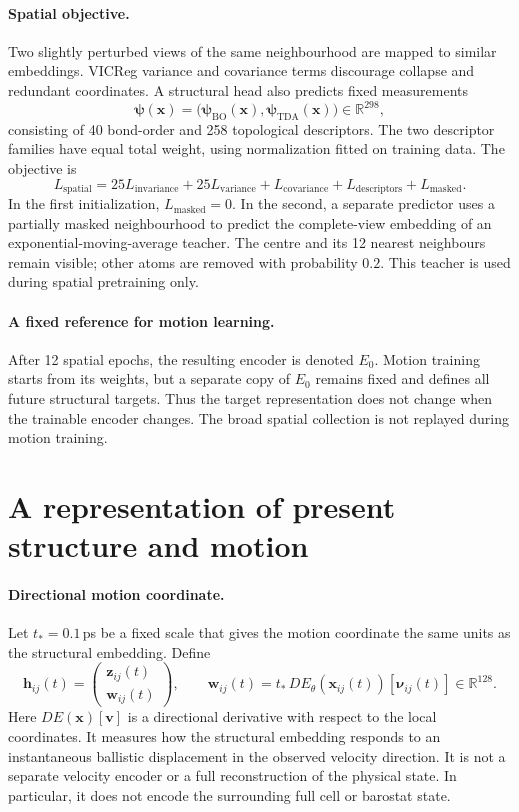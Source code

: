 \documentclass[11pt,a4paper]{article}
\newcommand{\R}{\mathbb R}
\newcommand{\x}{\mathbf x}
\newcommand{\z}{\mathbf z}
\begin{document}
\paragraph{Spatial objective.}
Two slightly perturbed views of the same neighbourhood are mapped to similar
embeddings. VICReg variance and covariance terms discourage collapse and redundant
coordinates. A structural head also predicts fixed measurements
\[
\boldsymbol\psi(\x)=
\bigl(\boldsymbol\psi_{\mathrm{BO}}(\x),
      \boldsymbol\psi_{\mathrm{TDA}}(\x)\bigr)\in\R^{298},
\]
consisting of 40 bond-order and 258 topological descriptors. The two descriptor
families have equal total weight, using normalization fitted on training data.
The objective is
\[
L_{\mathrm{spatial}}
=25L_{\mathrm{invariance}}+25L_{\mathrm{variance}}
 +L_{\mathrm{covariance}}+L_{\mathrm{descriptors}}+L_{\mathrm{masked}}.
\]
In the first initialization, $L_{\mathrm{masked}}=0$. In the second, a separate
predictor uses a partially masked neighbourhood to predict the complete-view
embedding of an exponential-moving-average teacher. The centre and its 12
nearest neighbours remain visible; other atoms are removed with probability
$0.2$. This teacher is used during spatial pretraining only.

\paragraph{A fixed reference for motion learning.}
After 12 spatial epochs, the resulting encoder is denoted $E_0$. Motion training
starts from its weights, but a separate copy of $E_0$ remains fixed and defines
all future structural targets. Thus the target representation does not change
when the trainable encoder changes. The broad spatial collection is not replayed
during motion training.

\section{A representation of present structure and motion}

\paragraph{Directional motion coordinate.}
Let $t_*=0.1$\,ps be a fixed scale that gives the motion coordinate the same units
as the structural embedding. Define
\begin{equation}
\boxed{
\mathbf h_{ij}(t)=
\begin{pmatrix}\z_{ij}(t)\\ \mathbf w_{ij}(t)\end{pmatrix},
\qquad
\mathbf w_{ij}(t)=t_*\,
D E_\theta(\x_{ij}(t))[\boldsymbol\nu_{ij}(t)]\in\R^{128}.
}
\label{eq:motion-input}
\end{equation}
Here $D E(\x)[\mathbf v]$ is a directional derivative with respect to the local
coordinates. It measures how the structural embedding responds to an
instantaneous ballistic displacement in the observed velocity direction.
It is not a separate velocity encoder or a full reconstruction of the physical
state. In particular, it does not encode the surrounding full cell or barostat
state.
\end{document}
